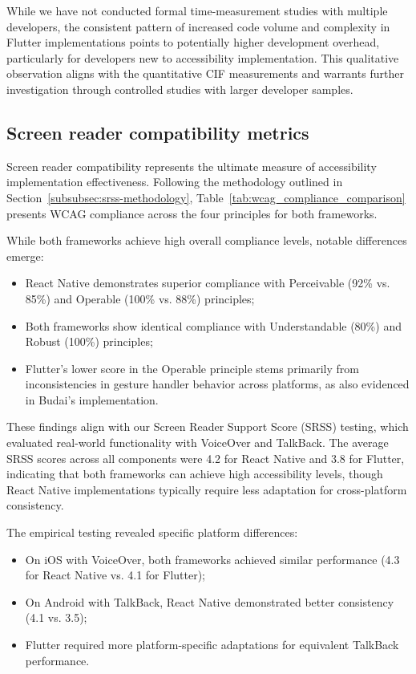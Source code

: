 {While we have not conducted formal time-measurement studies with multiple developers, the consistent pattern of increased code volume and complexity in Flutter implementations points to potentially higher development overhead, particularly for developers new to accessibility implementation. This qualitative observation aligns with the quantitative CIF measurements and warrants further investigation through controlled studies with larger developer samples.

\subsection{Screen reader compatibility metrics}
\label{subsec:screen-reader-metrics}

Screen reader compatibility represents the ultimate measure of accessibility implementation effectiveness. Following the methodology outlined in Section~\ref{subsubsec:srss-methodology}, Table~\ref{tab:wcag_compliance_comparison} presents WCAG compliance across the four principles for both frameworks.

While both frameworks achieve high overall compliance levels, notable differences emerge:

\begin{itemize}
    \item React Native demonstrates superior compliance with Perceivable (92\% vs. 85\%) and Operable (100\% vs. 88\%) principles;
    \item Both frameworks show identical compliance with Understandable (80\%) and Robust (100\%) principles;
    \item Flutter's lower score in the Operable principle stems primarily from inconsistencies in gesture handler behavior across platforms, as also evidenced in Budai's implementation.
\end{itemize}

These findings align with our Screen Reader Support Score (SRSS) testing, which evaluated real-world functionality with VoiceOver and TalkBack. The average SRSS scores across all components were 4.2 for React Native and 3.8 for Flutter, indicating that both frameworks can achieve high accessibility levels, though React Native implementations typically require less adaptation for cross-platform consistency.

The empirical testing revealed specific platform differences:

\begin{itemize}
    \item On iOS with VoiceOver, both frameworks achieved similar performance (4.3 for React Native vs. 4.1 for Flutter);
    \item On Android with TalkBack, React Native demonstrated better consistency (4.1 vs. 3.5);
    \item Flutter required more platform-specific adaptations for equivalent TalkBack performance.
\end{itemize}

}
